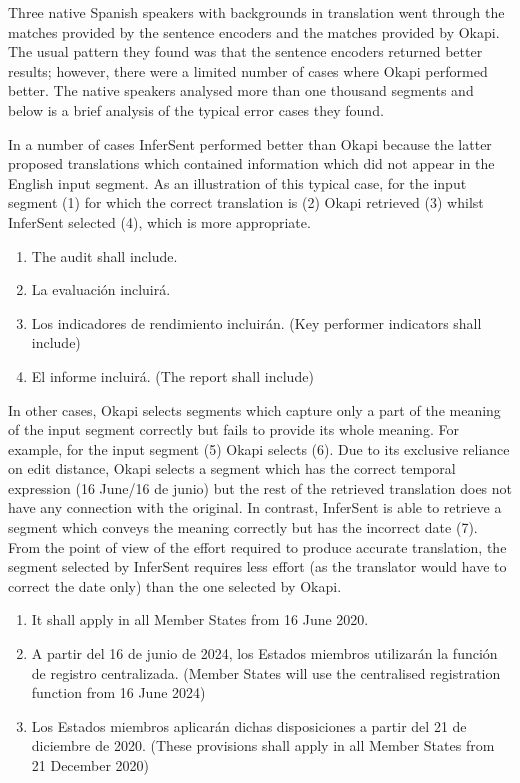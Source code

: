 Three native Spanish speakers with backgrounds in translation went through the matches provided by the sentence encoders and the matches provided by Okapi. The usual pattern they found was that the sentence encoders returned better results; however, there were a limited number of cases where Okapi performed better. The native speakers analysed more than one thousand segments and below is a brief analysis of the typical error cases they found.

In a number of cases InferSent performed better than Okapi because the latter proposed translations which contained information which did not appear in the English input segment. As an illustration of this typical case, for the input segment (1) for which the correct translation is (2) Okapi retrieved (3) whilst InferSent selected (4), which is more appropriate. 

\begin{enumerate}[label={(\arabic*)}]
	\item The audit shall include.
	\item La evaluación incluirá.
	\item Los indicadores de rendimiento incluirán. (Key performer indicators shall include)
	\item El informe incluirá. (The report shall include)
\end{enumerate}

In other cases, Okapi selects segments which capture only a part of the meaning of the input segment correctly but fails to provide its whole meaning. For example, for the input segment (5) Okapi selects (6). Due to its exclusive reliance on edit distance, Okapi selects a segment which has the correct temporal expression (16 June/16 de junio) but the rest of the retrieved translation does not have any connection with the original. In contrast, InferSent is able to retrieve a segment which conveys the meaning correctly but has the incorrect date (7). From the point of view of the effort required to produce accurate translation, the segment selected by InferSent requires less effort (as the translator would have to correct the date only) than the one selected by Okapi. 

\begin{enumerate}[resume,label={(\arabic*)}]
	\item It shall apply in all Member States from 16 June 2020.
	\item A partir del 16 de junio de 2024, los Estados miembros utilizarán la función de registro centralizada. (Member States will use the centralised registration function from 16 June 2024)
	\item Los Estados miembros aplicarán dichas disposiciones a partir del 21 de diciembre de 2020. (These provisions shall apply in all Member States from 21 December 2020)
	
\end{enumerate}

